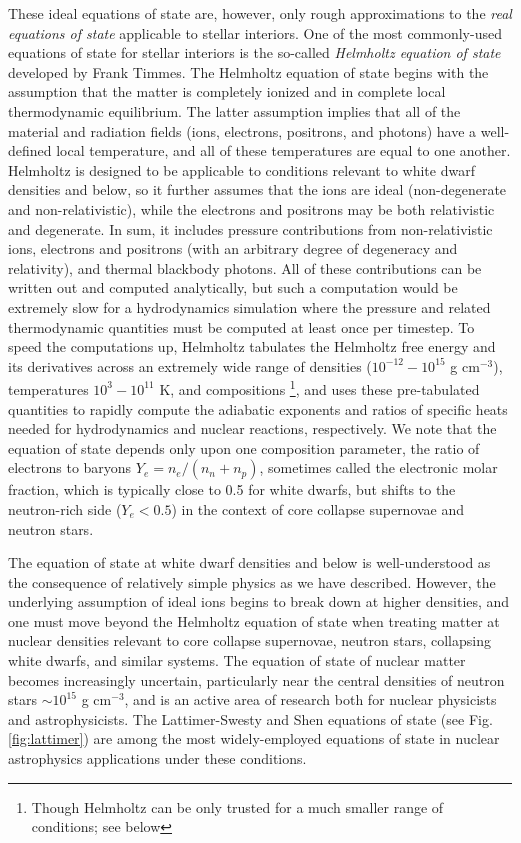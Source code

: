 \documentclass[notoc]{tufte-handout}
\begin{document}
These ideal equations of state are, however, only rough approximations to the {\it real equations of state} applicable to stellar interiors. One of the most commonly-used equations of state for stellar interiors is the so-called {\it Helmholtz equation of state} developed by Frank Timmes. The Helmholtz equation of state begins with the assumption that the matter is completely ionized and in complete local thermodynamic equilibrium. The latter assumption implies that all of the material and radiation fields (ions, electrons, positrons, and photons) have a well-defined local temperature, and all of these temperatures are equal to one another.  Helmholtz is designed to be applicable to conditions relevant to white dwarf densities and below, so it further assumes that the ions are ideal (non-degenerate and non-relativistic), while the electrons and positrons may be both relativistic and degenerate. In sum, it includes pressure contributions from non-relativistic ions, electrons and positrons (with an arbitrary degree of degeneracy and relativity), and thermal blackbody photons. All of these contributions can be written out and computed analytically, but such a computation would be extremely slow for a hydrodynamics simulation where the pressure and related thermodynamic quantities must be computed at least once per timestep. To speed the computations up, Helmholtz tabulates the Helmholtz free energy and its derivatives across an extremely wide range of densities ($10^{-12} - 10^{15}$ g cm$^{-3}$), temperatures $10^3 - 10^{11}$ K, and compositions \footnote {Though Helmholtz can be only trusted for a much smaller range of conditions; see below}, and uses these pre-tabulated quantities to rapidly compute the adiabatic exponents and ratios of specific heats needed for hydrodynamics and nuclear reactions, respectively. We note that the equation of state depends only upon one composition parameter, the ratio of electrons to baryons $Y_e = n_e / (n_n + n_p)$, sometimes called the electronic molar fraction, which is typically close to 0.5 for white dwarfs, but shifts to the neutron-rich side ($Y_e < 0.5$) in the context of core collapse supernovae and neutron stars. 

The equation of state at white dwarf densities and below is well-understood as the consequence of relatively simple physics as we have described. However, the underlying assumption of ideal ions begins to break down at higher densities, and one must move beyond the Helmholtz equation of state when treating matter at nuclear densities relevant to core collapse supernovae, neutron stars, collapsing white dwarfs, and similar systems.  The equation of state of nuclear matter becomes increasingly uncertain, particularly near the central densities of neutron stars $\sim 10^{15}$ g cm$^{-3}$, and is an active area of research both for nuclear physicists and astrophysicists. The Lattimer-Swesty and Shen equations of state (see Fig. \ref {fig:lattimer}) are among the most widely-employed equations of state in nuclear astrophysics applications under these conditions.
\end{document}
